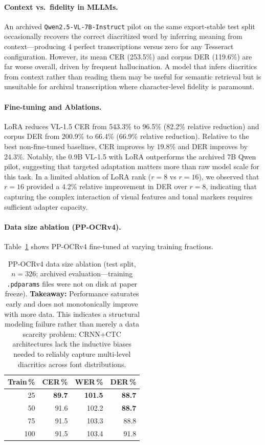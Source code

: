 \documentclass{article}
\begin{document}
\paragraph{Context vs.\ fidelity in MLLMs.}
An archived \texttt{Qwen2.5-VL-7B-Instruct} pilot on the same export-stable test split occasionally recovers the correct diacritized word by inferring meaning from context---producing 4 perfect transcriptions versus zero for any Tesseract configuration. However, its mean CER (253.5\%) and corpus DER (119.6\%) are far worse overall, driven by frequent hallucination. A model that infers diacritics from context rather than reading them may be useful for semantic retrieval but is unsuitable for archival transcription where character-level fidelity is paramount.

\paragraph{Fine-tuning and Ablations.}
LoRA reduces VL-1.5 CER from 543.3\% to 96.5\% (82.2\% relative reduction) and corpus DER from 200.9\% to 66.4\% (66.9\% relative reduction). Relative to the best non-fine-tuned baselines, CER improves by 19.8\% and DER improves by 24.3\%. Notably, the 0.9B VL-1.5 with LoRA outperforms the archived 7B Qwen pilot, suggesting that targeted adaptation matters more than raw model scale for this task.
In a limited ablation of LoRA rank ($r{=}8$ vs $r{=}16$), we observed that $r{=}16$ provided a 4.2\% relative improvement in DER over $r{=}8$, indicating that capturing the complex interaction of visual features and tonal markers requires sufficient adapter capacity.

\paragraph{Data size ablation (PP-OCRv4).}
Table~\ref{tab:ablation} shows PP-OCRv4 fine-tuned at varying training fractions.

\begin{table}[t]
  \centering
  \begin{tabular}{rrrr}
    \toprule
    Train\,\% & CER\,\% & WER\,\% & DER\,\% \\
    \midrule
    25 & \textbf{89.7} & \textbf{101.5} & \textbf{88.7} \\
    50 & 91.6 & 102.2 & \textbf{88.7} \\
    75 & 91.5 & 103.3 & 88.8 \\
    100 & 91.5 & 103.4 & 91.8 \\
    \bottomrule
  \end{tabular}
  \caption{PP-OCRv4 data size ablation (test split, $n{=}326$; archived evaluation---training \texttt{.pdparams} files were not on disk at paper freeze). \textbf{Takeaway:} Performance saturates early and does not monotonically improve with more data. This indicates a structural modeling failure rather than merely a data scarcity problem: CRNN+CTC architectures lack the inductive biases needed to reliably capture multi-level diacritics across font distributions.}
  \label{tab:ablation}
\end{table}
\end{document}
